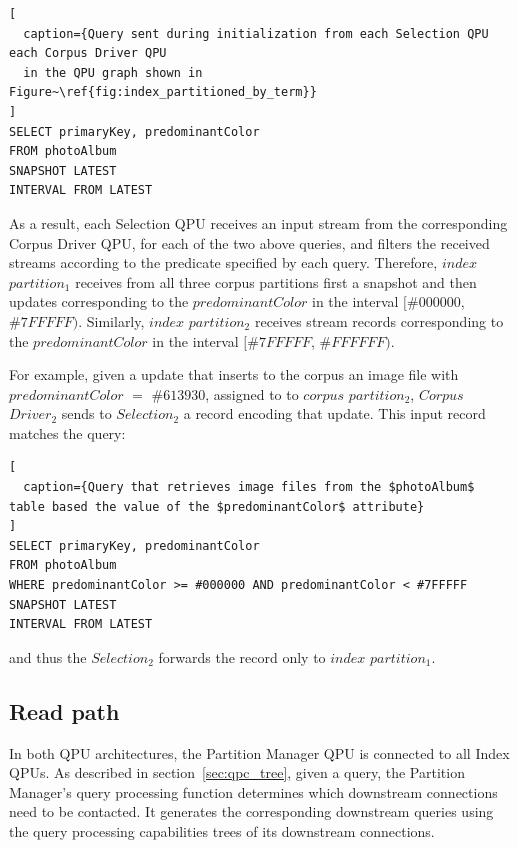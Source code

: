 \begin{lstlisting}[
  caption={Query sent during initialization from each Selection QPU each Corpus Driver QPU
  in the QPU graph shown in Figure~\ref{fig:index_partitioned_by_term}}
]
SELECT primaryKey, predominantColor
FROM photoAlbum
SNAPSHOT LATEST
INTERVAL FROM LATEST
\end{lstlisting}

As a result, each Selection QPU receives an input stream from the corresponding Corpus Driver QPU,
for each of the two above queries,
and filters the received streams according to the predicate specified by each query.
Therefore, $index$ $partition_1$ receives from all three corpus partitions first a snapshot and then updates
corresponding to the $predominantColor$ in the interval $[\#000000$, $\#7FFFFF)$.
Similarly, $index$ $partition_2$ receives stream records corresponding to the $predominantColor$ in the interval
$[\#7FFFFF$, $\#FFFFFF)$.

For example, given a update that inserts to the corpus an image file with $predominantColor$ $=$ $\#613930$, assigned to to $corpus$
$partition_2$, $Corpus$ $Driver_2$ sends to $Selection_2$ a record encoding that update.
This input record matches the query:

\begin{lstlisting}[
  caption={Query that retrieves image files from the $photoAlbum$ table based the value of the $predominantColor$ attribute}
]
SELECT primaryKey, predominantColor
FROM photoAlbum
WHERE predominantColor >= #000000 AND predominantColor < #7FFFFF
SNAPSHOT LATEST
INTERVAL FROM LATEST
\end{lstlisting}

and thus the $Selection_2$  forwards the record only to $index$ $partition_1$.

\subsection{Read path}
\label{sec:cs_index_partitioning_read_path}

In both QPU architectures, the Partition Manager QPU is connected to all Index QPUs.
As described in section~\ref{sec:qpc_tree}, given a query,
the Partition Manager's query processing function determines which downstream connections need to be contacted.
It generates the corresponding downstream queries using the query processing capabilities trees of its downstream connections.

